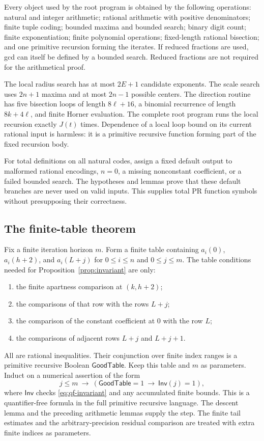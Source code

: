 \documentclass[11pt,letterpaper]{article}
\theoremstyle{definition}\newtheorem{definition}[theorem]{Definition}
\theoremstyle{remark}\newtheorem{remark}[theorem]{Remark}
\begin{document}
Every object used by the root program is obtained by the following
operations: natural and integer arithmetic; rational arithmetic with
positive denominators; finite tuple coding; bounded maxima and bounded
search; binary digit count; finite exponentiation; finite polynomial
operations; fixed-length rational bisection; and one primitive recursion
forming the iterates. If reduced fractions are used, gcd can itself be
defined by a bounded search. Reduced fractions are not required for the
arithmetical proof.

The local radius search has at most $2E+1$ candidate exponents. The scale
search uses $2n+1$ maxima and at most $2n-1$ possible centers. The direction
routine has five bisection loops of length $8\ell+16$, a binomial recurrence
of length $8k+4\ell$, and finite Horner evaluation. The complete root program
runs the local recursion exactly $J(t)$ times. Dependence of a local loop
bound on its current rational input is harmless: it is a primitive
recursive function forming part of the fixed recursion body.

For total definitions on all natural codes, assign a fixed default output
to malformed rational encodings, $n=0$, a missing nonconstant coefficient,
or a failed bounded search. The hypotheses and lemmas prove that these
default branches are never used on valid inputs. This supplies total PR
function symbols without presupposing their correctness.

\subsection{The finite-table theorem}

Fix a finite iteration horizon $m$. Form a finite table containing
$a_i(0)$, $a_i(h+2)$, and $a_i(L+j)$ for $0\le i\le n$ and $0\le j\le m$.
The table conditions needed for Proposition~\ref{prop:invariant} are only:
\begin{enumerate}
\item the finite apartness comparison at $(k,h+2)$;
\item the comparisons of that row with the rows $L+j$;
\item the comparison of the constant coefficient at $0$ with the row $L$;
\item the comparisons of adjacent rows $L+j$ and $L+j+1$.
\end{enumerate}
All are rational inequalities. Their conjunction over finite index ranges
is a primitive recursive Boolean $\mathsf{GoodTable}$.
Keep this table and $m$ as parameters. Induct on a numerical assertion of
the form
\[
 j\le m\ \longrightarrow\
 (\mathsf{GoodTable}=1\ \longrightarrow\ \mathsf{Inv}(j)=1),
\]
where $\mathsf{Inv}$ checks \eqref{eq:qf-invariant} and any accumulated
finite bounds. This is a quantifier-free formula in the full primitive
recursive language. The descent lemma and the preceding arithmetic lemmas
supply the step. The finite tail estimates and the arbitrary-precision
residual comparison are treated with extra finite indices as parameters.
\end{document}
